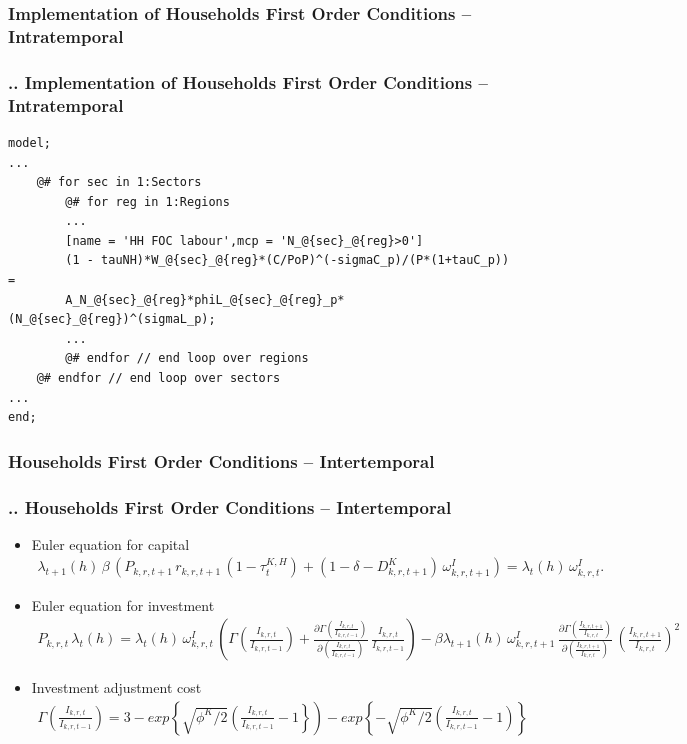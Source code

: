 \documentclass[11pt,aspectratio=169]{beamer}
\begin{document}
\subsubsection{Implementation of Households First Order Conditions -- Intratemporal}
\begin{frame}[fragile]
\frametitle{{\thesection.\thesubsection.\thesubsubsection} Implementation of Households First Order Conditions -- Intratemporal}

\begin{lstlisting}[frame = single]
model;
...
    @# for sec in 1:Sectors
        @# for reg in 1:Regions
        ...
        [name = 'HH FOC labour',mcp = 'N_@{sec}_@{reg}>0']
        (1 - tauNH)*W_@{sec}_@{reg}*(C/PoP)^(-sigmaC_p)/(P*(1+tauC_p)) = 
        A_N_@{sec}_@{reg}*phiL_@{sec}_@{reg}_p*(N_@{sec}_@{reg})^(sigmaL_p);
        ...						
        @# endfor // end loop over regions
    @# endfor // end loop over sectors
...
end;
\end{lstlisting}
\end{frame}


\subsubsection{Households First Order Conditions -- Intertemporal}
\begin{frame}
\frametitle{{\thesection.\thesubsection.\thesubsubsection} Households First Order Conditions -- Intertemporal}
\scriptsize
\begin{itemize}
\item Euler equation for capital
\begin{align*}
\lambda_{t+1}(h) \, \beta \, \left(P_{k,r,t+1} \, r_{k,r,t+1} \, (1 - \tau^{K,H}_{t})+(1 - \delta - D^{K}_{k,r,t+1}) \, \omega^{I}_{k,r,t+1} \right) = \lambda_{t}(h) \, \omega^{I}_{k,r,t}.
\end{align*}
\item Euler equation for investment
\begin{align*}
P_{k,r,t} \, \lambda_{t}(h) = \lambda_{t}(h) \, \omega^{I}_{k,r,t} \, \left(\Gamma(\frac{I_{k,r,t}}{I_{k,r,t-1}})+\frac{\partial \Gamma(\frac{I_{k,r,t}}{I_{k,r,t-1}})}{\partial (\frac{I_{k,r,t}}{I_{k,r,t-1}})} \, \frac{I_{k,r,t}}{I_{k,r,t-1}} \right) - \beta \lambda_{t+1}(h) \, \omega^{I}_{k,r,t+1} \, \frac{\partial \Gamma(\frac{I_{k,r,t+1}}{I_{k,r,t}})}{\partial (\frac{I_{k,r,t+1}}{I_{k,r,t}})} \, \left(\frac{I_{k,r,t+1}}{I_{k,r,t}}\right)^2
\end{align*}
\item Investment adjustment cost
\begin{align*}
\Gamma(\frac{I_{k,r,t}}{I_{k,r,t-1}}) = 3 - exp\left\lbrace\sqrt{\phi^{K}/2}\left(\frac{I_{k,r,t}}{I_{k,r,t-1}}-1\right\rbrace\right) - exp\left\lbrace-\sqrt{\phi^{K}/2}\left(\frac{I_{k,r,t}}{I_{k,r,t-1}}-1\right)\right\rbrace
\end{align*}
\end{itemize}
\end{frame}
\end{document}
